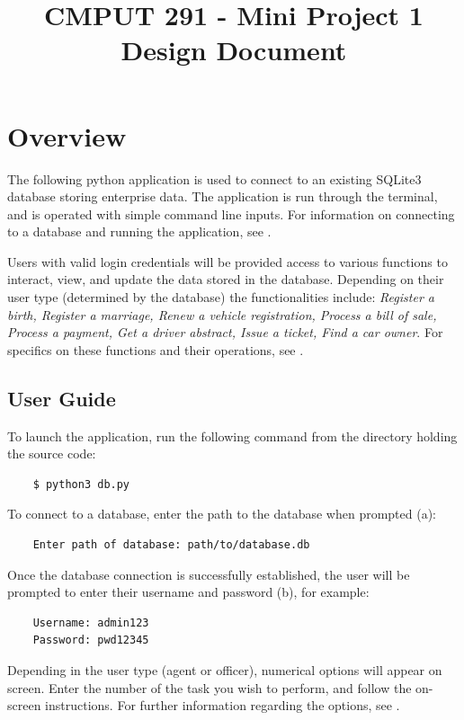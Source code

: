 \documentclass[10pt, a4paper]{article}
\begin{document}
{\selectfont

\title{\vspace{-20mm}CMPUT 291 - Mini Project 1 Design Document}
\date{}
\maketitle
\vspace{-20mm}
\section{Overview}\label{OV}
The following python application is used to connect to an existing SQLite3 database storing enterprise data. The application is run through the terminal, and is operated with simple command line inputs. For information on connecting to a database and running the application, see \emph{}.

Users with valid login credentials will be provided access to various functions to interact, view, and update the data stored in the database. Depending on their user type (determined by the database) the functionalities include: \emph{Register a birth, Register a marriage, Renew a vehicle registration, Process a bill of sale, Process a payment, Get a driver abstract, Issue a ticket, Find a car owner}. For specifics on these functions and their operations, see \emph{}.

\subsection{User Guide}\label{UG}
To launch the application, run the following command from the directory holding the source code:
\begin{lstlisting}
    $ python3 db.py
\end{lstlisting}
To connect to a database, enter the path to the database when prompted (a):
\begin{lstlisting}
    Enter path of database: path/to/database.db
\end{lstlisting}
Once the database connection is successfully established, the user will be prompted to enter their username and password (b), for example:
\begin{lstlisting}
    Username: admin123
    Password: pwd12345
\end{lstlisting}
Depending in the user type (agent or officer), numerical options will appear on screen. Enter the number of the task you wish to perform, and follow the on-screen instructions. For further information regarding the options, see \emph{}. 

}
\end{document}
